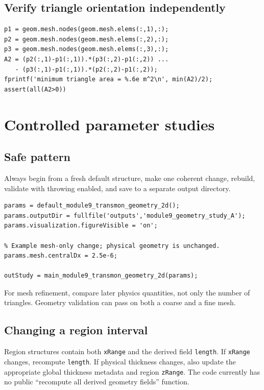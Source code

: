 \documentclass[11pt]{article}
\begin{document}
\subsection{Verify triangle orientation independently}

\begin{lstlisting}[style=projectmatlab]
p1 = geom.mesh.nodes(geom.mesh.elems(:,1),:);
p2 = geom.mesh.nodes(geom.mesh.elems(:,2),:);
p3 = geom.mesh.nodes(geom.mesh.elems(:,3),:);
A2 = (p2(:,1)-p1(:,1)).*(p3(:,2)-p1(:,2)) ...
   - (p3(:,1)-p1(:,1)).*(p2(:,2)-p1(:,2));
fprintf('minimum triangle area = %.6e m^2\n', min(A2)/2);
assert(all(A2>0))
\end{lstlisting}

\section{Controlled parameter studies}

\subsection{Safe pattern}

Always begin from a fresh default structure, make one coherent change, rebuild, validate with throwing enabled, and save to a separate output directory.

\begin{lstlisting}[style=projectmatlab]
params = default_module9_transmon_geometry_2d();
params.outputDir = fullfile('outputs','module9_geometry_study_A');
params.visualization.figureVisible = 'on';

% Example mesh-only change; physical geometry is unchanged.
params.mesh.centralDx = 2.5e-6;

outStudy = main_module9_transmon_geometry_2d(params);
\end{lstlisting}

For mesh refinement, compare later physics quantities, not only the number of triangles. Geometry validation can pass on both a coarse and a fine mesh.

\subsection{Changing a region interval}

Region structures contain both \texttt{xRange} and the derived field \texttt{length}. If \texttt{xRange} changes, recompute \texttt{length}. If physical thickness changes, also update the appropriate global thickness metadata and region \texttt{zRange}. The code currently has no public ``recompute all derived geometry fields'' function.
\end{document}
